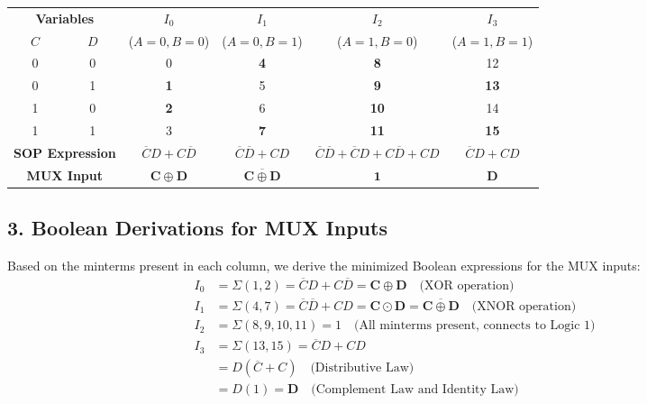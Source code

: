 \documentclass[12pt,a3paper]{article}
\begin{document}
\begin{enumerate}
\begin{tcolorbox}[enhanced,breakable,ansbox,colback=cD!4,colframe=cD,boxrule=0.8pt,arc=5pt,title={\textbf{Answer}},fonttitle=\bfseries\color{white},colbacktitle=cD]
\begin{center}
\renewcommand{\arraystretch}{1.3}
\begin{tabular}{c c | c | c | c | c}
\toprule
\multicolumn{2}{c|}{\textbf{Variables}} & \textbf{$I_0$} & \textbf{$I_1$} & \textbf{$I_2$} & \textbf{$I_3$} \\
$C$ & $D$ & ($A=0, B=0$) & ($A=0, B=1$) & ($A=1, B=0$) & ($A=1, B=1$) \\
\midrule
0 & 0 & 0 & \textcolor{cD}{\textbf{4}} & \textcolor{cD}{\textbf{8}} & 12 \\
0 & 1 & \textcolor{cD}{\textbf{1}} & 5 & \textcolor{cD}{\textbf{9}} & \textcolor{cD}{\textbf{13}} \\
1 & 0 & \textcolor{cD}{\textbf{2}} & 6 & \textcolor{cD}{\textbf{10}} & 14 \\
1 & 1 & 3 & \textcolor{cD}{\textbf{7}} & \textcolor{cD}{\textbf{11}} & \textcolor{cD}{\textbf{15}} \\
\midrule
\multicolumn{2}{c|}{\textbf{SOP Expression}} & $\overline{C}D + C\overline{D}$ & $\overline{C}\overline{D} + CD$ & $\overline{C}\overline{D} + \overline{C}D + C\overline{D} + CD$ & $\overline{C}D + CD$ \\
\multicolumn{2}{c|}{\textbf{MUX Input}} & $\mathbf{C \oplus D}$ & $\mathbf{\overline{C \oplus D}}$ & $\mathbf{1}$ & $\mathbf{D}$ \\
\bottomrule
\end{tabular}
\end{center}

\vspace{0.2cm}
\subsection*{3. Boolean Derivations for MUX Inputs}
Based on the minterms present in each column, we derive the minimized Boolean expressions for the MUX inputs:
\begin{align*}
    I_0 &= \Sigma(1, 2) = \overline{C}D + C\overline{D} = \mathbf{C \oplus D} \quad \text{(XOR operation)} \\[6pt]
    I_1 &= \Sigma(4, 7) = \overline{C}\overline{D} + CD = \mathbf{C \odot D} = \mathbf{\overline{C \oplus D}} \quad \text{(XNOR operation)} \\[6pt]
    I_2 &= \Sigma(8, 9, 10, 11) = 1 \quad \text{(All minterms present, connects to Logic 1)} \\[6pt]
    I_3 &= \Sigma(13, 15) = \overline{C}D + CD \\
        &= D(\overline{C} + C) \quad \text{(Distributive Law)} \\
        &= D(1) = \mathbf{D} \quad \text{(Complement Law and Identity Law)}
\end{align*}


\end{tcolorbox}
\end{enumerate}
\end{document}
